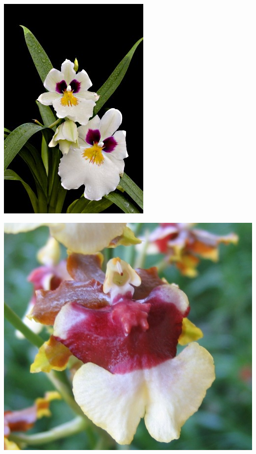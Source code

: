 \documentclass{article}
\begin{document}
\begin{center}
\includegraphics[height=0.9\textheight, angle=90]{../Orchid_Miltonia3.jpg}
\end{center}
\newpage

\begin{center}
\includegraphics[height=0.9\textheight, angle=90]{../Orchid_Oncidium.jpg}
\end{center}
\newpage
\end{document}
